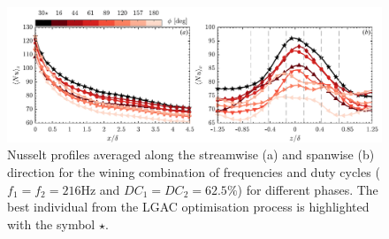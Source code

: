 \begin{figure} %
    \centering
    \includegraphics[width=0.99\linewidth]{figures/F9.pdf}
    \caption{Nusselt profiles averaged along the streamwise (a) and spanwise (b) direction for the wining combination of frequencies and duty cycles ($f_1 = f_2 =216\mathrm{Hz}$ and $DC_1 = DC_2 = 62.5\%$) for different phases. The best individual from the LGAC optimisation process is highlighted with the symbol $\star$.}
    \label{fig:Nuprofiles_phase}
\end{figure}

